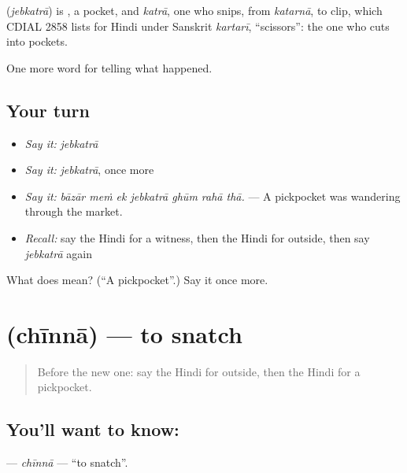 \begin{cousinweb}
\textbf{} (\emph{jebkatrā}) is \textbf{}, a pocket, and \emph{katrā}, one who snips, from \emph{katarnā}, to clip, which CDIAL 2858 lists for Hindi under Sanskrit \emph{kartarī}, \textquotedblleft{}scissors\textquotedblright{}: the one who cuts into pockets.
\end{cousinweb}

\begin{grammarlens}[title={What you've built}]
One more word for telling what happened.
\end{grammarlens}

\subsection*{Your turn}
\begin{itemize}
\raggedright
  \item \emph{Say it:} \emph{jebkatrā}
  \item \emph{Say it:} \emph{jebkatrā}, once more
  \item \emph{Say it:} \emph{bāzār meṁ ek jebkatrā ghūm rahā thā.} — A pickpocket was wandering through the market.
  \item \emph{Recall:} say the Hindi for a witness, then the Hindi for outside, then say \emph{jebkatrā} again
\end{itemize}

\begin{tcolorbox}[breakable,colback=teal!4,colframe=teal!35!black,title={Before you move on}]
What does  mean? (\textquotedblleft{}A pickpocket\textquotedblright{}.) Say it once more.
\end{tcolorbox}
\section[\texorpdfstring{\hi{छीनना} (chīnnā)}{छीनना (chīnnā)}]{ (chīnnā) — to snatch}

\label{lesson:HI-C289-chinna}



\begin{quote}
Before the new one: say the Hindi for outside, then the Hindi for a pickpocket.
\end{quote}

\subsection*{You'll want to know: }
\textbf{} — \emph{chīnnā} — \textquotedblleft{}to snatch\textquotedblright{}.

